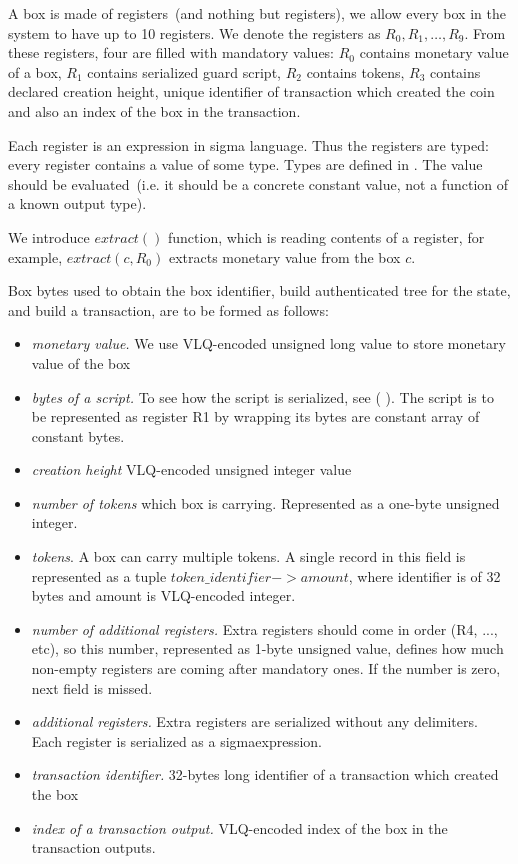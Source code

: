 \documentclass[]{article}   %
\newcommand{\authnote}[2]{\marginpar{\parbox{\marginparwidth}{\tiny %
  \textsf{#1 {\textcolor{blue}{notes: #2}}}}}%
  \textcolor{blue}{\textbf{\dag}}}
\newcommand{\authnote}[2]{
  \textsf{#1 \textcolor{blue}{: #2}}}
\newcommand{\authnote}[2]{}
\newcommand{\knote}[1]{{\authnote{\textcolor{green}{Alex notes}}{#1}}}
\newcommand{\coin}{box}
\newcommand{\Coin}{Box}
\newcommand{\sigm}{sigma}
\newcommand{\extract}[1]{$extract({#1})$}
\begin{document}
A \coin{} is made of registers~(and nothing but registers), we allow every \coin{} in the system to have up to 10 registers.
We denote the registers as $R_0,R_1,\ldots,R_9$.
From these registers, four are filled with mandatory values: $R_0$ contains monetary value of a \coin{}, $R_1$ contains
serialized guard script, $R_2$ contains tokens, $R_3$ contains declared creation height, unique identifier of transaction which created the
coin and also an index of the \coin{} in the transaction.

Each register is an expression in \sigm{} language. Thus the registers are typed: every register contains a value of
some type. Types are defined in \knote{ref}. The value should be evaluated~(i.e. it should be a concrete constant value,
not a function of a known output type).

We introduce \extract{} function, which is reading contents of a register, for example, \extract{c, R_0} extracts monetary value
from the \coin{} $c$.

\Coin{} bytes used to obtain the \coin{} identifier, build authenticated tree for the state, and build a transaction,
are to be formed as follows:

\begin{itemize}
    \item{\em monetary value. } We use VLQ-encoded unsigned long value to store monetary value of the \coin{}
    \item{\em bytes of a script. } To see how the script is serialized, see (\knote{link to \sigm language expressions
    serialization}). The script is to be represented as register R1 by wrapping its bytes are constant array of constant
    bytes.
    \item{\em creation height } VLQ-encoded unsigned integer value
    \item{\em number of tokens } which box is carrying. Represented as a one-byte unsigned integer.
    \item{\em tokens}. A box can carry multiple tokens. A single record in this field is represented as a tuple
    $token\_identifier -> amount$, where identifier is of 32 bytes and amount is VLQ-encoded integer.
    \item{\em number of additional registers. } Extra registers should come in order (R4, ..., etc), so this number,
    represented as 1-byte unsigned value, defines how much non-empty registers are coming after mandatory ones. If the number is
    zero, next field is missed.
    \item{\em additional registers. } Extra registers are serialized without any delimiters. Each register is
    serialized as a \sigm expression.
    \item{\em transaction identifier. } 32-bytes long identifier of a transaction which created the \coin{}
    \item{\em index of a transaction output. } VLQ-encoded index of the \coin{} in the transaction outputs.
\end{itemize}
\end{document}
